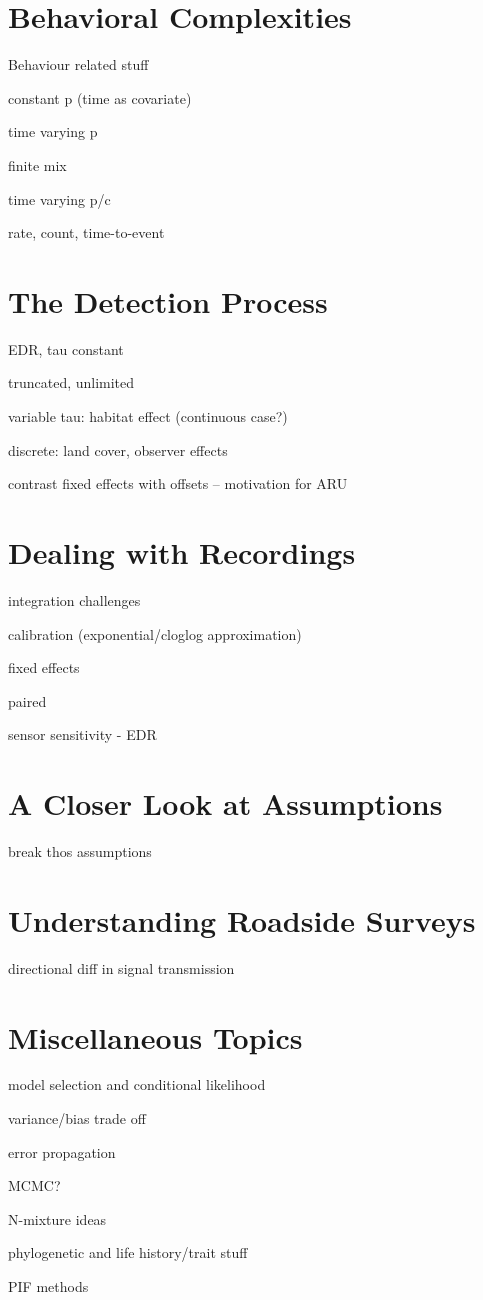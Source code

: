 \documentclass[12pt,]{book}
\begin{document}
\hypertarget{behavior}{%
\chapter{Behavioral Complexities}\label{behavior}}

Behaviour related stuff

constant p (time as covariate)

time varying p

finite mix

time varying p/c

rate, count, time-to-event

\hypertarget{detection}{%
\chapter{The Detection Process}\label{detection}}

EDR, tau constant

truncated, unlimited

variable tau: habitat effect (continuous case?)

discrete: land cover, observer effects

contrast fixed effects with offsets -- motivation for ARU

\hypertarget{recordings}{%
\chapter{Dealing with Recordings}\label{recordings}}

integration challenges

calibration (exponential/cloglog approximation)

fixed effects

paired

sensor sensitivity - EDR

\hypertarget{assumptions}{%
\chapter{A Closer Look at Assumptions}\label{assumptions}}

break thos assumptions

\hypertarget{roadsides}{%
\chapter{Understanding Roadside Surveys}\label{roadsides}}

directional diff in signal transmission

\hypertarget{extras}{%
\chapter{Miscellaneous Topics}\label{extras}}

model selection and conditional likelihood

variance/bias trade off

error propagation

MCMC?

N-mixture ideas

phylogenetic and life history/trait stuff

PIF methods


\end{document}
